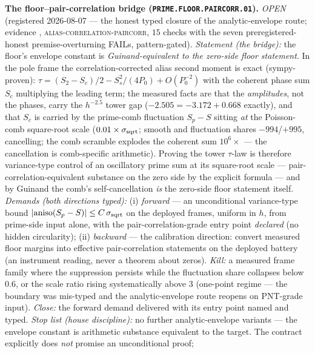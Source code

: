 \documentclass[11pt,a4paper]{article}
\begin{document}
\par\smallskip\noindent\textbf{The floor--pair-correlation bridge
(\texttt{PRIME.FLOOR.PAIRCORR.01}).}
{\sloppy
\emph{OPEN} (registered 2026-08-07 --- the honest typed closure
of the analytic-envelope route; evidence
,
\textsc{alias-correlation-paircorr}, $15$ checks with the seven
preregistered-honest premise-overturning FAILs, pattern-gated).
\emph{Statement (the bridge):} the floor's envelope constant is
\emph{Guinand-equivalent to the zero-side floor statement}.  In
the pole frame the correlation-corrected alias second moment is
exact (sympy-proven): $\tau = (S_2 - S_c)/2 - S_s^2/(4P_0) +
O(P_0^{-2})$ with the coherent phase sum $S_c$ multiplying the
leading term; the measured facts are that the \emph{amplitudes},
not the phases, carry the $h^{-2.5}$ tower gap ($-2.505 = -3.172
+ 0.668$ exactly), and that $S_c$ is carried by the prime-comb
fluctuation $S_p - S$ sitting \emph{at} the Poisson-comb
square-root scale ($0.01\times\sigma_{\rm sqrt}$; smooth and
fluctuation shares $-994$/$+995$, cancelling; the comb scramble
explodes the coherent sum $10^6\times$ --- the cancellation is
comb-specific arithmetic).  Proving the tower $\tau$-law is
therefore variance-type control of an oscillatory prime sum at
its square-root scale --- pair-correlation-equivalent substance
on the zero side by the explicit formula --- and by Guinand the
comb's self-cancellation \emph{is} the zero-side floor statement
itself.  \emph{Demands (both directions typed):} (i)
\emph{forward} --- an unconditional variance-type bound
$|{\rm aniso}(S_p - S)| \le C\,\sigma_{\rm sqrt}$ on the deployed
frames, uniform in $h$, from prime-side input alone, with the
pair-correlation-grade entry point \emph{declared} (no hidden
circularity); (ii) \emph{backward} --- the calibration direction:
convert measured floor margins into effective pair-correlation
statements on the deployed battery (an instrument reading, never
a theorem about zeros).  \emph{Kill:} a measured frame family
where the suppression persists while the fluctuation share
collapses below $0.6$, or the scale ratio rising systematically
above $3$ (one-point regime --- the boundary was mis-typed and
the analytic-envelope route reopens on PNT-grade input).
\emph{Close:} the forward demand delivered with its entry point
named and typed.  \emph{Stop list (house discipline):} no further
analytic-envelope variants --- the envelope constant is
arithmetic substance equivalent to the target.  The contract
explicitly does \emph{not} promise an unconditional proof;
}
\end{document}
